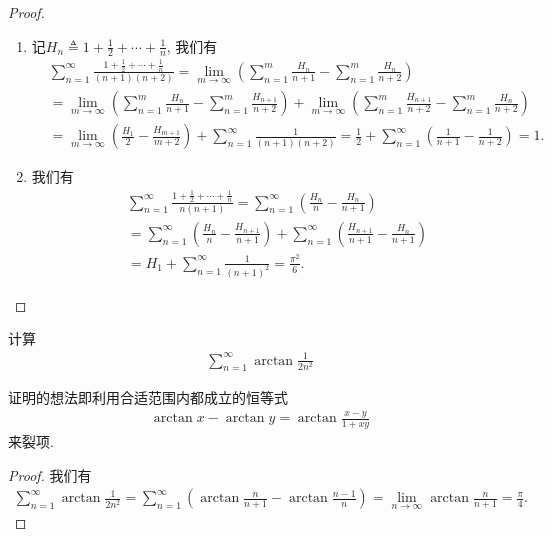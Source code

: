 \documentclass[../../main.tex]{subfiles}
\begin{document}
\begin{proof}
\begin{enumerate}
\item 记$H_n \triangleq 1 + \frac{1}{2} + \cdots + \frac{1}{n}$, 我们有
\begin{align*}
&\sum_{n=1}^{\infty} \frac{1 + \frac{1}{2} + \cdots + \frac{1}{n}}{(n + 1)(n + 2)} = \lim_{m \to \infty} \left( \sum_{n=1}^{m} \frac{H_n}{n + 1} - \sum_{n=1}^{m} \frac{H_n}{n + 2} \right) \\
&= \lim_{m \to \infty} \left( \sum_{n=1}^{m} \frac{H_n}{n + 1} - \sum_{n=1}^{m} \frac{H_{n + 1}}{n + 2} \right) + \lim_{m \to \infty} \left( \sum_{n=1}^{m} \frac{H_{n + 1}}{n + 2} - \sum_{n=1}^{m} \frac{H_n}{n + 2} \right) \\
&= \lim_{m \to \infty} \left( \frac{H_1}{2} - \frac{H_{m + 1}}{m + 2} \right) + \sum_{n=1}^{\infty} \frac{1}{(n + 1)(n + 2)} = \frac{1}{2} + \sum_{n=1}^{\infty} \left( \frac{1}{n + 1} - \frac{1}{n + 2} \right) = 1.
\end{align*}

\item 我们有
\begin{align*}
&\sum_{n=1}^{\infty} \frac{1 + \frac{1}{2} + \cdots + \frac{1}{n}}{n(n + 1)} = \sum_{n=1}^{\infty} \left( \frac{H_n}{n} - \frac{H_n}{n + 1} \right) \\
&= \sum_{n=1}^{\infty} \left( \frac{H_n}{n} - \frac{H_{n + 1}}{n + 1} \right) + \sum_{n=1}^{\infty} \left( \frac{H_{n + 1}}{n + 1} - \frac{H_n}{n + 1} \right) \\
&= H_1 + \sum_{n=1}^{\infty} \frac{1}{(n + 1)^2} = \frac{\pi^2}{6}.
\end{align*}
\end{enumerate}
\end{proof}

\begin{example}
计算
\begin{align*}
\sum_{n=1}^{\infty} \arctan \frac{1}{2n^2}
\end{align*}
\end{example}
\begin{note}
证明的想法即利用合适范围内都成立的恒等式
\begin{align*}
\arctan x - \arctan y = \arctan \frac{x - y}{1 + xy}
\end{align*}
来裂项.
\end{note}
\begin{proof}
我们有
\begin{align*}
\sum_{n=1}^{\infty} \arctan \frac{1}{2n^2} = \sum_{n=1}^{\infty} \left( \arctan \frac{n}{n + 1} - \arctan \frac{n - 1}{n} \right) = \lim_{n \to \infty} \arctan \frac{n}{n + 1} = \frac{\pi}{4}.
\end{align*}
\end{proof}
\end{document}
